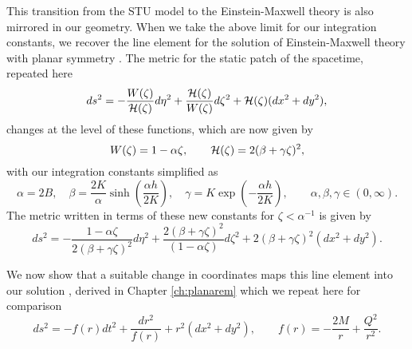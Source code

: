 This transition from the STU model to the Einstein-Maxwell theory is also mirrored in our geometry. When we take the above limit for our integration constants, we recover the line element for the solution of Einstein-Maxwell theory with planar symmetry . The metric for the static patch of the spacetime, repeated here
\begin{equation}
\label{eq:genmet}
    ds^2 = - \frac{W(\zeta)}{{\cal H}(\zeta)} d\eta^2 + \frac{{\cal H}(\zeta)}{W(\zeta)} d\zeta^2  + {\cal H}(\zeta) (dx^2 + dy^2),
\end{equation}
changes at the level of these functions, which are now given by
\begin{equation*}
 W(\zeta) = 1 - \alpha \zeta, \qquad {\cal H}(\zeta) = 2(\beta + \gamma \zeta)^2,
\end{equation*}
with our integration constants simplified as
\begin{equation*}
    \alpha = 2B, \quad \beta =\frac{2 K}{\alpha} \sinh\left(\frac{\alpha h}{2 K}\right), \quad \gamma = K \exp\left(-\frac{\alpha h}{2 K}\right), \qquad \alpha,\beta,\gamma \in (0, \infty).
\end{equation*}
The metric written in terms of these new constants for $\zeta < \alpha^{-1}$ is given by
\begin{equation}
\label{eq:global}
  ds^2 = - \frac{1 - \alpha \zeta }{2(\beta + \gamma \zeta)^2} d\eta^2 + \frac{2(\beta + \gamma \zeta)^2}{(1 - \alpha \zeta )} d\zeta^2  + 2(\beta + \gamma \zeta)^2(dx^2 + dy^2).
\end{equation}

We now show that a suitable change in coordinates maps this line element into our solution , derived in Chapter \ref{ch:planarem} which we repeat here for comparison
\begin{equation*}
  ds^2 =  - f(r) dt^2 + \frac{dr^2}{f(r)}  + r^2(dx^2 + dy^2), \qquad   f(r) = -\frac{2M}{r} + \frac{Q^2}{r^2}.
\end{equation*}

